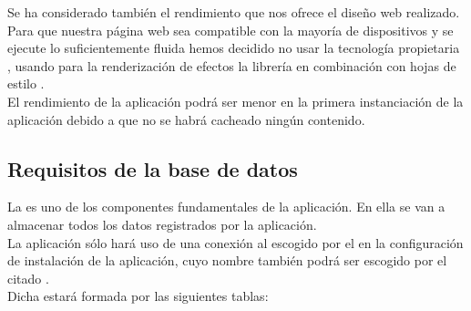 Se ha considerado también el rendimiento que nos ofrece el diseño web
realizado. Para que nuestra página web sea compatible con la mayoría
de dispositivos y se ejecute lo suficientemente fluida hemos decidido
no usar la tecnología propietaria , usando para la
renderización de efectos la librería  en combinación
con hojas de estilo .\\

El rendimiento de la aplicación podrá ser menor en la primera
instanciación de la aplicación debido a que no se habrá cacheado
ningún contenido.

\subsection{Requisitos de la base de datos}
La  es uno de los componentes fundamentales de
la aplicación. En ella se van a almacenar todos los datos registrados
por la aplicación.\\

La aplicación sólo hará uso de una conexión al  escogido
por el  en la configuración de instalación de la
aplicación, cuyo nombre también podrá ser escogido por el citado
.\\

Dicha  estará formada por las siguientes tablas:

